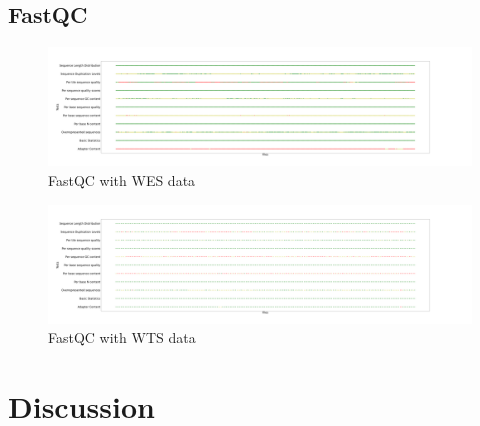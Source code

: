\documentclass[a4paper]{article}
\begin{document}
        \subsection{FastQC}

            \begin{figure}[p]
                \centering
                \includegraphics[width=0.8 \linewidth]{figures/FastQC/FastQC_WES.png}
                \caption{FastQC with WES data}
                \label{fig:fastqc-wes}
            \end{figure}

            \begin{figure}[p]
                \centering
                \includegraphics[width=0.8 \linewidth]{figures/FastQC/FastQC_WTS.png}
                \caption{FastQC with WTS data}
                \label{fig:fastqc-wts}
            \end{figure}

    \section{Discussion}

    
    
\end{document}
